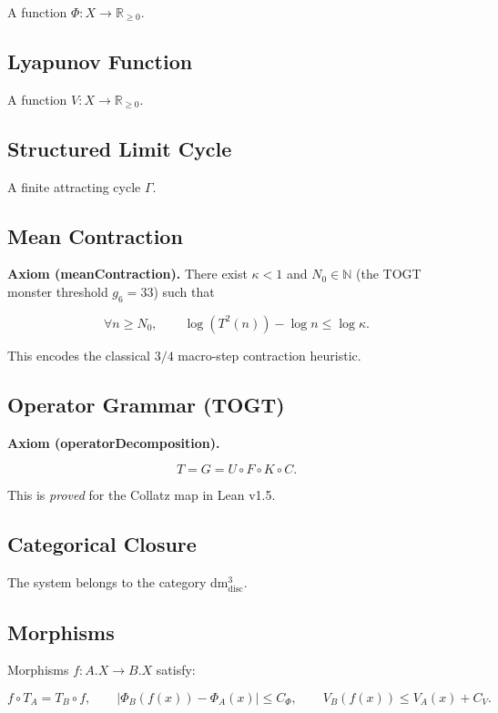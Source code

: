 \documentclass[11pt]{article}
\begin{document}
A function $\Phi : X \to \mathbb{R}_{\ge 0}$.

\subsection{Lyapunov Function}

A function $V : X \to \mathbb{R}_{\ge 0}$.

\subsection{Structured Limit Cycle}

A finite attracting cycle $\Gamma$.

\subsection{Mean Contraction}

\textbf{Axiom (meanContraction).}  
There exist $\kappa < 1$ and $N_0 \in \mathbb{N}$ (the TOGT monster threshold $g_6 = 33$) such that


\[
\forall n \ge N_0,\qquad
\log(T^2(n)) - \log n \le \log \kappa.
\]


This encodes the classical $3/4$ macro-step contraction heuristic.

\subsection{Operator Grammar (TOGT)}

\textbf{Axiom (operatorDecomposition).}  


\[
T = G = U \circ F \circ K \circ C.
\]


This is \emph{proved} for the Collatz map in Lean v1.5.

\subsection{Categorical Closure}

The system belongs to the category dm$^3_{\mathrm{disc}}$.

\subsection{Morphisms}

Morphisms $f : A.X \to B.X$ satisfy:


\[
f \circ T_A = T_B \circ f,
\qquad
|\Phi_B(f(x)) - \Phi_A(x)| \le C_\Phi,
\qquad
V_B(f(x)) \le V_A(x) + C_V.
\]
\end{document}
